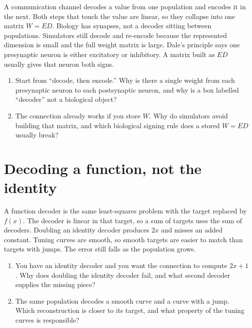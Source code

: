 \documentclass[11pt,letterpaper]{article}
\begin{document}
\begin{idea}
A communication channel decodes a value from one population and encodes it in the next. Both steps that touch the value are linear, so they collapse into one matrix \(W = ED\). Biology has synapses, not a decoder sitting between populations. Simulators still decode and re-encode because the represented dimension is small and the full weight matrix is large. Dale's principle says one presynaptic neuron is either excitatory or inhibitory. A matrix built as \(ED\) usually gives that neuron both signs.
\end{idea}

\begin{enumerate}
\item Start from ``decode, then encode.'' Why is there a single weight from each presynaptic neuron to each postsynaptic neuron, and why is a box labelled ``decoder'' not a biological object?
\item The connection already works if you store \(W\). Why do simulators avoid building that matrix, and which biological signing rule does a stored \(W = ED\) usually break?
\end{enumerate}

\section{Decoding a function, not the identity}

\begin{idea}
A function decoder is the same least-squares problem with the target replaced by \(f(x)\). The decoder is linear in that target, so a sum of targets uses the sum of decoders. Doubling an identity decoder produces \(2x\) and misses an added constant. Tuning curves are smooth, so smooth targets are easier to match than targets with jumps. The error still falls as the population grows.
\end{idea}

\begin{enumerate}
\item You have an identity decoder and you want the connection to compute \(2x + 1\). Why does doubling the identity decoder fail, and what second decoder supplies the missing piece?
\item The same population decodes a smooth curve and a curve with a jump. Which reconstruction is closer to its target, and what property of the tuning curves is responsible?
\end{enumerate}
\end{document}
